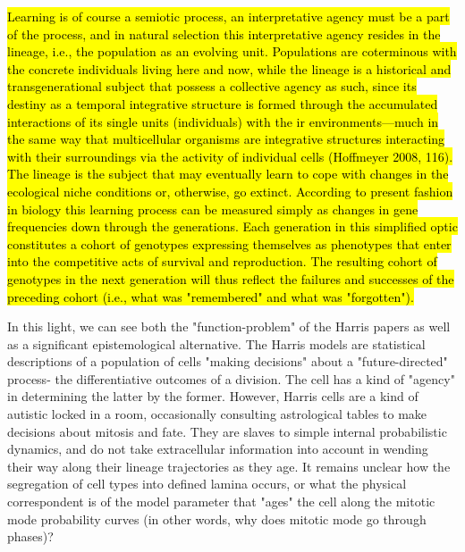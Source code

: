 \begin{longquote}
\hl{Learning is of course a semiotic 
process, an interpretative agency must be a part of the process, and in natural selection this interpretative agency resides in the 
lineage, i.e., the population as an evolving unit.
Populations are coterminous with the concrete individuals living here and now, while the lineage
 is a historical and transgenerational subject that possess a collective agency as such, since its destiny as 
a temporal integrative structure is formed through the accumulated interactions of its single units (individuals) with the
ir environments—much in the same way that multicellular organisms are integrative structures interacting with their surroundings 
via the activity of individual cells (Hoffmeyer 2008, 116). 
The lineage is the subject that may eventually learn to cope with changes in the ecological niche conditions or, 
otherwise, go extinct. According to present fashion in biology this learning process 
can be measured simply as changes in gene frequencies down through the 
generations. Each generation in this simplified optic 
constitutes a cohort of genotypes expressing themselves as phenotypes that enter into the competitive acts of survival 
and reproduction. The resulting cohort of genotypes in the next generation will thus 
reflect the failures and successes of the preceding cohort (i.e., what was 
"remembered" and what was "forgotten").}\end{longquote}

\bigskip

In this light, we can see both the "function-problem" of the Harris papers as well as a significant epistemological alternative. The Harris models are statistical descriptions of a population of cells "making decisions" about a "future-directed" process- the differentiative outcomes of a division. The cell has a kind of "agency" in determining the latter by the former. However, Harris cells are a kind of autistic locked in a room, occasionally consulting astrological tables to make decisions about mitosis and fate. They are slaves to simple internal probabilistic dynamics, and do not take extracellular information into account in wending their way along their lineage trajectories as they age. It remains unclear how the segregation of cell types into defined lamina occurs, or what the physical correspondent is of the model parameter that "ages" the cell along the mitotic mode probability curves (in other words, why does mitotic mode go through phases)?

